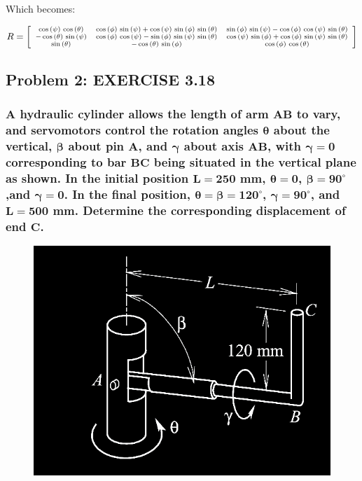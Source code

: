 \documentclass[12pt, letterpaper]{../assignment}
\begin{document}
Which becomes:

\begin{answer}
$$ \scriptsize R = \left[\begin{array}{ccc} \cos\left(\psi \right)\,\cos\left(\theta \right) & \cos\left(\phi \right)\,\sin\left(\psi \right)+\cos\left(\psi \right)\,\sin\left(\phi \right)\,\sin\left(\theta \right) & \sin\left(\phi \right)\,\sin\left(\psi \right)-\cos\left(\phi \right)\,\cos\left(\psi \right)\,\sin\left(\theta \right)\\ -\cos\left(\theta \right)\,\sin\left(\psi \right) & \cos\left(\phi \right)\,\cos\left(\psi \right)-\sin\left(\phi \right)\,\sin\left(\psi \right)\,\sin\left(\theta \right) & \cos\left(\psi \right)\,\sin\left(\phi \right)+\cos\left(\phi \right)\,\sin\left(\psi \right)\,\sin\left(\theta \right)\\ \sin\left(\theta \right) & -\cos\left(\theta \right)\,\sin\left(\phi \right) & \cos\left(\phi \right)\,\cos\left(\theta \right) \end{array}\right] $$
\end{answer}

\subsection*{Problem 2: EXERCISE 3.18}
\subsubsection*{A hydraulic cylinder allows the length of arm $\bm{AB}$ to vary,
and servomotors control the rotation angles $\bm{\theta}$ about the vertical,
$\bm{\beta}$ about pin $\bm{A}$, and $\bm{\gamma}$ about axis $\bm{AB}$,
with $\bm{\gamma = 0}$ corresponding to bar $\bm{BC}$ being situated in the vertical
plane as shown. In the initial position $\bm{L = 250}$ mm, $\bm{\theta = 0}$,
$\bm{\beta = 90^\circ}$,and $\bm{\gamma = 0}$.
In the final position, $\bm{\theta = \beta = 120^\circ}$, $\bm{\gamma = 90^\circ}$,
and $\bm{L = 500}$ mm. Determine the corresponding displacement of end $\bm{C}$.}

\begin{figure}[H]
    \centering
    \includegraphics[frame]{images/P_3_18.png}
\end{figure}
\end{document}
